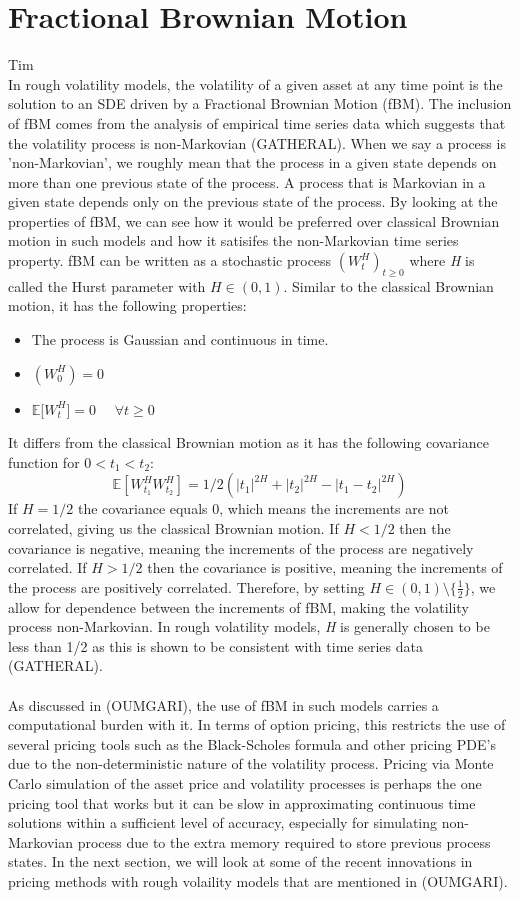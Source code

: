 \documentclass[12pt]{article}
\begin{document}
\section{Fractional Brownian Motion}
Tim
\\
In rough volatility models, the volatility of a given asset at any time point is the solution to an SDE driven by a Fractional Brownian Motion (fBM). The inclusion of fBM comes from the analysis of empirical time series data which suggests that the volatility process is non-Markovian ({\color{red}GATHERAL}). When we say a process is 'non-Markovian', we roughly mean that the process in a given state depends on more than one previous state of the process. A process that is Markovian in a given state depends only on the previous state of the process. By looking at the properties of fBM, we can see how it would be preferred over classical Brownian motion in such models and how it satisifes the non-Markovian time series property. fBM can be written as a stochastic process $(\textit{$W^H_t$})_{t\ge0}$ where \textit{H} is called the Hurst parameter with $\textit{H} \in (0,1)$. Similar to the classical Brownian motion, it has the following properties: 
\begin{itemize} \item The process is Gaussian and continuous in time. \item $(\textit{$W^H_0$})=0$  \item $\mathbb{E}$[\textit{$W^H_t$}]$=0$ \ \  $\forall t \ge 0$ \end{itemize}
It differs from the classical Brownian motion as it has the following covariance function for $0 < t_1 < t_2$: $$\mathbb{E}[\textit{$W^H_{t_1}$} \textit{$W^H_{t_2}$}] = 1/2 (|t_1|^{2H}+|t_2|^{2H}-|t_1-t_2|^{2H})$$ If $H=1/2$ the covariance equals $0$, which means the increments are not correlated, giving us the classical Brownian motion. If $H<1/2$ then the covariance is negative, meaning the increments of the process are negatively correlated. If $H>1/2$ then the covariance is positive, meaning the increments of the process are positively correlated.  Therefore, by setting $H\in(0,1)\setminus\{\frac{1}{2}\}$, we allow for dependence between the increments of fBM, making the volatility process non-Markovian.  In rough volatility models, \textit{H} is generally chosen to be less than 1/2 as this is shown to be consistent with time series data ({\color{red}GATHERAL}).
\\
\\
As discussed in ({\color{red}OUMGARI}),  the use of fBM in such models carries a computational burden with it. In terms of option pricing, this restricts the use of several pricing tools such as the Black-Scholes formula and other pricing PDE's due to the non-deterministic nature of the volatility process.  Pricing via Monte Carlo simulation of the asset price and volatility processes is perhaps the one pricing tool that works but it can be slow in approximating continuous time solutions within a sufficient level of accuracy, especially for simulating non-Markovian process due to the extra memory required to store previous process states. In the next section, we will look at some of the recent innovations in pricing methods with rough volaility models that are mentioned in ({\color{red}OUMGARI}).
\end{document}
